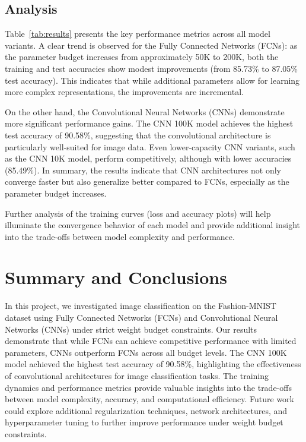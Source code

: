 \documentclass[11pt]{amsart}
\begin{document}
\subsection*{Analysis}
Table~\ref{tab:results} presents the key performance metrics across all model variants. A clear trend is observed for the Fully Connected Networks (FCNs): as the parameter budget increases from approximately 50K to 200K, both the training and test accuracies show modest improvements (from 85.73\% to 87.05\% test accuracy). This indicates that while additional parameters allow for learning more complex representations, the improvements are incremental.

On the other hand, the Convolutional Neural Networks (CNNs) demonstrate more significant performance gains. The CNN 100K model achieves the highest test accuracy of 90.58\%, suggesting that the convolutional architecture is particularly well-suited for image data. Even lower-capacity CNN variants, such as the CNN 10K model, perform competitively, although with lower accuracies (85.49\%). In summary, the results indicate that CNN architectures not only converge faster but also generalize better compared to FCNs, especially as the parameter budget increases.

Further analysis of the training curves (loss and accuracy plots) will help illuminate the convergence behavior of each model and provide additional insight into the trade-offs between model complexity and performance.


\section*{Summary and Conclusions}\label{sec:summary}

In this project, we investigated image classification on the Fashion-MNIST dataset using Fully Connected Networks (FCNs) and Convolutional Neural Networks (CNNs) under strict weight budget constraints. Our results demonstrate that while FCNs can achieve competitive performance with limited parameters, CNNs outperform FCNs across all budget levels. The CNN 100K model achieved the highest test accuracy of 90.58\%, highlighting the effectiveness of convolutional architectures for image classification tasks. The training dynamics and performance metrics provide valuable insights into the trade-offs between model complexity, accuracy, and computational efficiency. Future work could explore additional regularization techniques, network architectures, and hyperparameter tuning to further improve performance under weight budget constraints.
\end{document}

